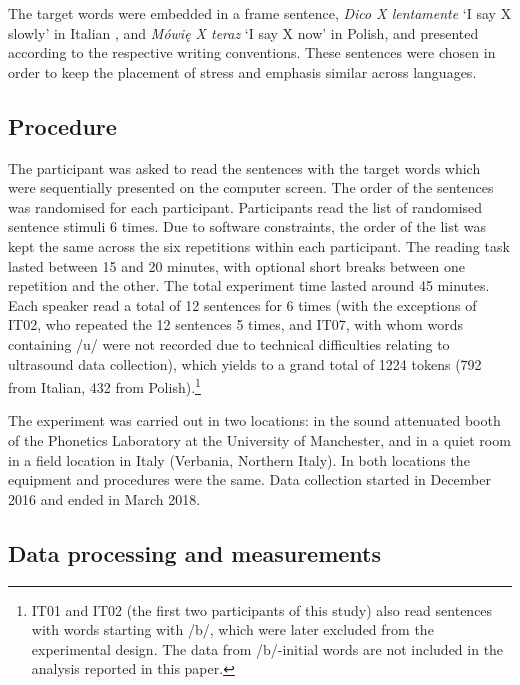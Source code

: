 \documentclass[preprint]{JASAnew}
\begin{document}
The target words were embedded in a frame sentence, \emph{Dico X
lentamente} `I say X slowly' in Italian \citep[following][]{hajek2008},
and \emph{Mówię X teraz} `I say X now' in Polish, and presented
according to the respective writing conventions. These sentences were
chosen in order to keep the placement of stress and emphasis similar
across languages.

\subsection{Procedure}\label{procedure}

The participant was asked to read the sentences with the target words
which were sequentially presented on the computer screen. The order of
the sentences was randomised for each participant. Participants read the
list of randomised sentence stimuli 6 times. Due to software
constraints, the order of the list was kept the same across the six
repetitions within each participant. The reading task lasted between 15
and 20 minutes, with optional short breaks between one repetition and
the other. The total experiment time lasted around 45 minutes. Each
speaker read a total of 12 sentences for 6 times (with the exceptions of
IT02, who repeated the 12 sentences 5 times, and IT07, with whom words
containing /u/ were not recorded due to technical difficulties relating
to ultrasound data collection), which yields to a grand total of 1224
tokens (792 from Italian, 432 from
Polish).\footnote{IT01 and IT02 (the first two participants of this study) also read sentences with words starting with /b/, which were later excluded from the experimental design. The data from /b/-initial words are not included in the analysis reported in this paper.}

The experiment was carried out in two locations: in the sound attenuated
booth of the Phonetics Laboratory at the University of Manchester, and
in a quiet room in a field location in Italy (Verbania, Northern Italy).
In both locations the equipment and procedures were the same. Data
collection started in December 2016 and ended in March 2018.

\subsection{Data processing and
measurements}\label{data-processing-and-measurements}
\end{document}
